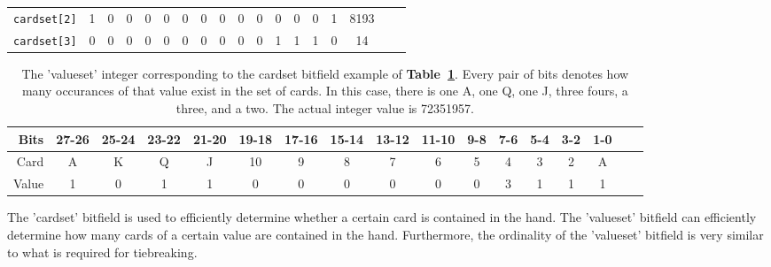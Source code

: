 \begin{table}[htb]
\begin{small}
\begin{center}
\begin{tabular}{|r|c|c|c|c|c|c|c|c|c|c|c|c|c|c|c|c|r|}
\texttt{cardset[2]} &     1            &    0            &  0              &  0              &  0 & 0  &  0 & 0  &  0 &  0 & 0   &  0   &  0   &  1    & 8193           \\
\texttt{cardset[3]} &     0            &     0           &  0              &  0              &   0 &   0&  0 &  0 &   0& 0  & 1  &  1   &  1   & 0     & 14      \\
\hline
\end{tabular}
\label{tab:CardsetBitfield}
\end{center}
\end{small}
\end{table}

\begin{table}[htb]
\captionsetup{position=top}
\caption[Valueset field]{The 'valueset' integer corresponding to the cardset bitfield example of \textbf{Table~\ref{tab:CardsetBitfield}}.
Every pair of bits denotes how many occurances of that value exist in the set of cards.
In this case, there is one A, one Q, one J, three fours, a three, and a two.
The actual integer value is 72351957.}
\begin{small}
\begin{center}
\begin{tabular}{|r|c|c|c|c|c|c|c|c|c|c|c|c|c|c|c|c|}
\hline
Bits    &  27-26 & 25-24 & 23-22 & 21-20 & 19-18 & 17-16 & 15-14 & 13-12 & 11-10 & 9-8 & 7-6 & 5-4 & 3-2 & 1-0                       \\ \hline
Card    &    A    &     K & Q     & J     & 10    &     9 &     8 & 7     &     6 &  5  &   4 &   3 & 2   & A                          \\ \hline
Value  &    1    &0      & 1     &  1    &  0    & 0     &  0    &  0    &  0    &0    &  3  & 1   & 1   & 1     \\
\hline
\end{tabular}
\label{tab:ValuesetInteger}
\end{center}
\end{small}
\end{table}

The 'cardset' bitfield is used to efficiently determine whether a certain card is contained in the hand.
The 'valueset' bitfield can efficiently determine how many cards of a certain value are contained in the hand.
Furthermore, the ordinality of the 'valueset' bitfield is very similar to what is required for tiebreaking.


